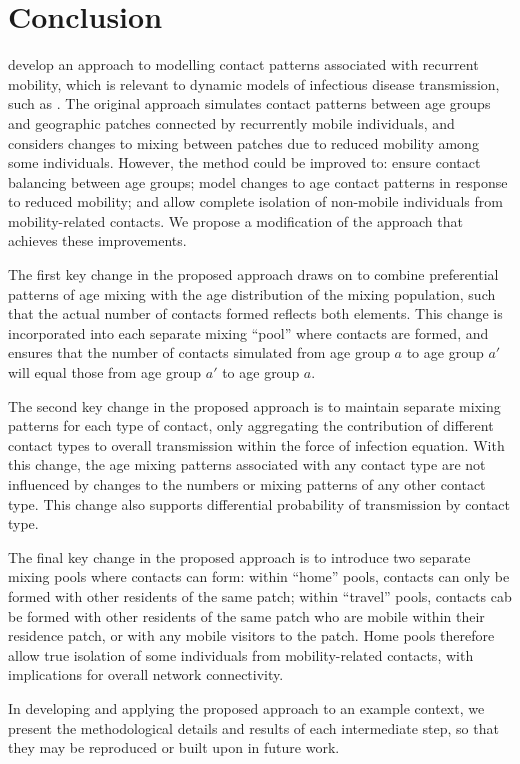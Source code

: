 \section{Conclusion}\label{conc}
\citet{Arenas2020} develop an approach to modelling
contact patterns associated with recurrent mobility,
which is relevant to dynamic models of infectious disease transmission, such as \covid.
The original approach simulates contact patterns between
age groups and geographic patches connected by recurrently mobile individuals,
and considers changes to mixing between patches due to reduced mobility among some individuals.
However, the method could be improved to:
ensure contact balancing between age groups;
model changes to age contact patterns in response to reduced mobility; and
allow complete isolation of non-mobile individuals from mobility-related contacts.
We propose a modification of the approach that achieves these improvements.
\par
The first key change in the proposed approach draws on \cite{Arregui2018} to
combine preferential patterns of age mixing with the age distribution of the mixing population,
such that the actual number of contacts formed reflects both elements.
This change is incorporated into each separate mixing ``pool'' where contacts are formed,
and ensures that the number of contacts simulated from age group $a$ to age group $a'$
will equal those from age group $a'$ to age group $a$.
\par
The second key change in the proposed approach is to
maintain separate mixing patterns for each type of contact,
only aggregating the contribution of different contact types to overall transmission
within the force of infection equation.
With this change, the age mixing patterns associated with any contact type
are not influenced by changes to the numbers or mixing patterns of any other contact type.
This change also supports differential probability of transmission by contact type.
\par
The final key change in the proposed approach is to
introduce two separate mixing pools where contacts can form:
within ``home'' pools, contacts can only be formed with other residents of the same patch;
within ``travel'' pools, contacts cab be formed with other residents of the same patch
who are mobile within their residence patch, or with any mobile visitors to the patch.
Home pools therefore allow true isolation of some individuals from mobility-related contacts,
with implications for overall network connectivity.
\par
In developing and applying the proposed approach to an example context,
we present the methodological details and results of each intermediate step,
so that they may be reproduced or built upon in future work.

